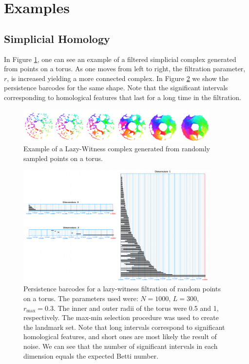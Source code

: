 \documentclass[10pt]{article}
\begin{document}
\section{Examples}

\subsection{Simplicial Homology}

In Figure \ref{lwtorus}, one can see an example of a filtered simplicial complex generated from points on a torus. As one moves from left to right, the filtration parameter, $r$, is increased yielding a more connected complex. In Figure \ref{lwtorusbarcodes} we show the persistence barcodes for the same shape. Note that the significant intervals corresponding to homological features that last for a long time in the filtration.

\begin{figure}
\centering
\includegraphics[width=0.9\textwidth]{tori_small.png}
\caption{Example of a Lazy-Witness complex generated from randomly sampled points on a torus.} \label{lwtorus}
\end{figure}

\begin{figure}
\centering
\includegraphics[width=0.9\textwidth]{barcodes_small.png}
\caption{Persistence barcodes for a lazy-witness filtration of random points on a torus. The parameters used were: $N = 1000$, $L = 300$, $r_{\max} = 0.3$. The inner and outer radii of the torus were 0.5 and 1, respectively. The max-min selection procedure was used to create the landmark set. Note that long intervals correspond to significant homological features, and short ones are most likely the result of noise. We can see that the number of significant intervals in each dimension equals the expected Betti number.} \label{lwtorusbarcodes}
\end{figure}
\end{document}
